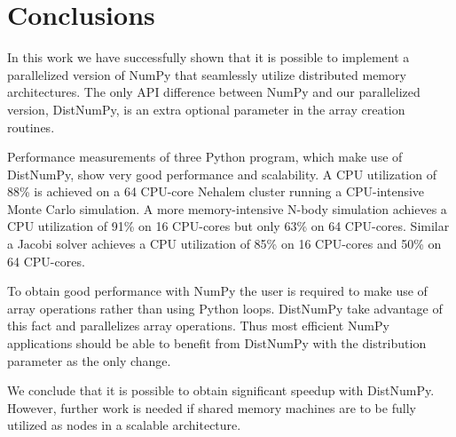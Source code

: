 \documentclass{sigplanconf}
\begin{document}
\section{Conclusions}
In this work we have successfully shown that it is possible to implement a parallelized version of NumPy\cite{numpy} that seamlessly utilize distributed memory architectures. The only API difference between NumPy and our parallelized version, DistNumPy, is an extra optional parameter in the array creation routines.

Performance measurements of three Python program, which make use of DistNumPy, show very good performance and scalability. A CPU utilization of 88\% is achieved on a 64 CPU-core Nehalem cluster running a CPU-intensive Monte Carlo simulation. A more memory-intensive N-body simulation achieves a CPU utilization of 91\% on 16 CPU-cores but only 63\% on 64 CPU-cores. Similar a Jacobi solver achieves a CPU utilization of 85\% on 16 CPU-cores and 50\% on 64 CPU-cores.

To obtain good performance with NumPy the user is required to make use of array operations rather than using Python loops. DistNumPy take advantage of this fact and parallelizes array operations. Thus most efficient NumPy applications should be able to benefit from DistNumPy with the distribution parameter as the only change.

We conclude that it is possible to obtain significant speedup with DistNumPy. However, further work is needed if shared memory machines are to be fully utilized as nodes in a scalable architecture.






\end{document}
